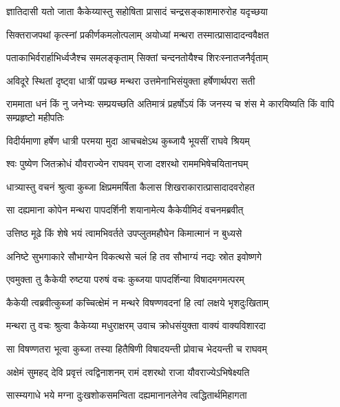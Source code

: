 \twolineshloka
{ज्ञातिदासी यतो जाता कैकेय्यास्तु सहोषिता}
{प्रासादं चन्द्रसङ्काशमारुरोह यदृच्छया} %

\twolineshloka
{सिक्तराजपथां कृत्स्नां प्रकीर्णकमलोत्पलाम्}
{अयोध्यां मन्थरा तस्मात्प्रासादादन्ववैक्षत} %

\twolineshloka
{पताकाभिर्वरार्हाभिर्ध्वजैश्च समलङ्कृताम्}
{सिक्तां चन्दनतोयैश्च शिरःस्नातजनैर्वृताम्} %

\twolineshloka
{अविदूरे स्थितां दृष्ट्वा धात्रीं पप्रच्छ मन्थरा}
{उत्तमेनाभिसंयुक्ता हर्षेणार्थपरा सती} %

\threelineshloka
{राममाता धनं किं नु जनेभ्यः सम्प्रयच्छति}
{अतिमात्रं प्रहर्षोऽयं किं जनस्य च शंस मे}
{कारयिष्यति किं वापि सम्प्रहृष्टो महीपतिः} %

\twolineshloka
{विदीर्यमाणा हर्षेण धात्री परमया मुदा}
{आचचक्षेऽथ कुब्जायै भूयसीं राघवे श्रियम्} %

\twolineshloka
{श्वः पुष्येण जितक्रोधं यौवराज्येन राघवम्}
{राजा दशरथो राममभिषेचयितानघम्} %

\twolineshloka
{धात्र्यास्तु वचनं श्रुत्वा कुब्जा क्षिप्रममर्षिता}
{कैलास शिखराकारात्प्रासादादवरोहत} %

\twolineshloka
{सा दह्यमाना कोपेन मन्थरा पापदर्शिनी}
{शयानामेत्य कैकेयीमिदं वचनमब्रवीत्} %

\twolineshloka
{उत्तिष्ठ मूढे किं शेषे भयं त्वामभिवर्तते}
{उपप्लुतमहौघेन किमात्मानं न बुध्यसे} %

\twolineshloka
{अनिष्टे सुभगाकारे सौभाग्येन विकत्थसे}
{चलं हि तव सौभाग्यं नद्यः स्रोत इवोष्णगे} %

\twolineshloka
{एवमुक्ता तु कैकेयी रुष्टया परुषं वचः}
{कुब्जया पापदर्शिन्या विषादमगमत्परम्} %

\twolineshloka
{कैकेयी त्वब्रवीत्कुब्जां कच्चित्क्षेमं न मन्थरे}
{विषण्णवदनां हि त्वां लक्षये भृशदुःखिताम्} %

\twolineshloka
{मन्थरा तु वचः श्रुत्वा कैकेय्या मधुराक्षरम्}
{उवाच क्रोधसंयुक्ता वाक्यं वाक्यविशारदा} %

\twolineshloka
{सा विषण्णतरा भूत्वा कुब्जा तस्या हितैषिणी}
{विषादयन्ती प्रोवाच भेदयन्ती च राघवम्} %

\twolineshloka
{अक्षेमं सुमहद् देवि प्रवृत्तं त्वद्विनाशनम्}
{रामं दशरथो राजा यौवराज्येऽभिषेक्ष्यति} %

\twolineshloka
{सास्म्यगाधे भये मग्ना दुःखशोकसमन्विता}
{दह्यमानानलेनेव त्वद्धितार्थमिहागता} %

